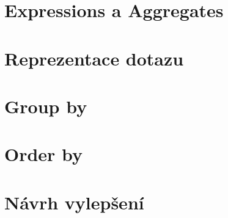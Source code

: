 \section{Expressions a Aggregates}

\section{Reprezentace dotazu}

\section{Group by}

\section{Order by}

\section{Návrh vylepšení}